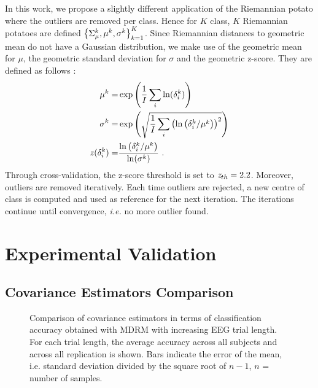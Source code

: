 In this work, we propose a slightly different application of the Riemannian potato where the outliers are removed per class. 
Hence for $K$ class, $K$ Riemannian potatoes are defined $\left\{ \P^k_{\mu}, \mu^k, \sigma^k \right\}_{k=1}^K$.
Since Riemannian distances to geometric mean do not have a Gaussian distribution, we make use of the geometric mean for $\mu$, the geometric standard deviation for $\sigma$ and the geometric z-score.
They are defined as follows \citep{congedo2013eeg}:
\begin{equation}
  \begin{split}
    \mu^k = & \exp \left( \frac{1}{I} \sum_i \ln(\distR^k_i) \right)\\
    \sigma^k = & \exp \left( \sqrt{\frac{1}{I} \sum_i \left( \ln \left( \distR^k_i / \mu^k \right) \right)^2 } \right)\\
    \zs(\distR^k_i) = & \frac{\ln \left( \distR^k_i / \mu^k \right)}{\ln(\sigma^k)} \ .\\
  \end{split}
\end{equation}
Through cross-validation, the z-score threshold is set to $\zs_{th}=2.2$.
Moreover, outliers are removed iteratively. 
Each time outliers are rejected, a new centre of class is computed and used as reference for the next iteration.
The iterations continue until convergence, \textit{i.e.} no more outlier
found. 
\section{Experimental Validation}
\label{sec:experimental-validation}

\subsection{Covariance Estimators Comparison}

\begin{figure}[ht!]
  \centering
  \caption{Comparison of covariance estimators in terms of classification accuracy
    obtained with MDRM with increasing EEG trial length. For each trial length, the average accuracy 
    across all subjects and across all replication is shown. 
    Bars indicate the error of the mean, i.e. standard deviation divided by the square root of $n-1$, $n$ = number of samples.}
    \label{fig:acc_errorbar}
  \end{figure}

